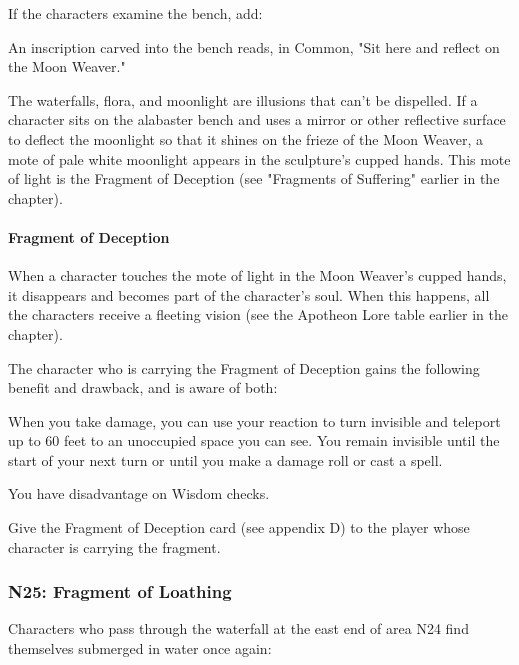 \documentclass[10pt,a4paper,twoside,twocolumn,openany,nodeprecatedcode]{dndbook}
\begin{document}
If the characters examine the bench, add:

\begin{DndReadAloud}{}
An inscription carved into the bench reads, in Common, "Sit here and reflect on the Moon Weaver."

\end{DndReadAloud}

The waterfalls, flora, and moonlight are illusions that can't be dispelled. If a character sits on the alabaster bench and uses a mirror or other reflective surface to deflect the moonlight so that it shines on the frieze of the Moon Weaver, a mote of pale white moonlight appears in the sculpture's cupped hands. This mote of light is the Fragment of Deception (see "Fragments of Suffering" earlier in the chapter).

\paragraph{Fragment of Deception}
When a character touches the mote of light in the Moon Weaver's cupped hands, it disappears and becomes part of the character's soul. When this happens, all the characters receive a fleeting vision (see the Apotheon Lore table earlier in the chapter).

The character who is carrying the Fragment of Deception gains the following benefit and drawback, and is aware of both:

\begin{DndComment}{}

\begin{description}[nolistsep]
\item[Benefit.]
When you take damage, you can use your reaction to turn invisible and teleport up to 60 feet to an unoccupied space you can see. You remain invisible until the start of your next turn or until you make a damage roll or cast a spell.
\item[Drawback.]
You have disadvantage on Wisdom checks.
\end{description}

\end{DndComment}

Give the Fragment of Deception card (see appendix D) to the player whose character is carrying the fragment.

\subsubsection{N25: Fragment of Loathing}
Characters who pass through the waterfall at the east end of area N24 find themselves submerged in water once again:
\end{document}
